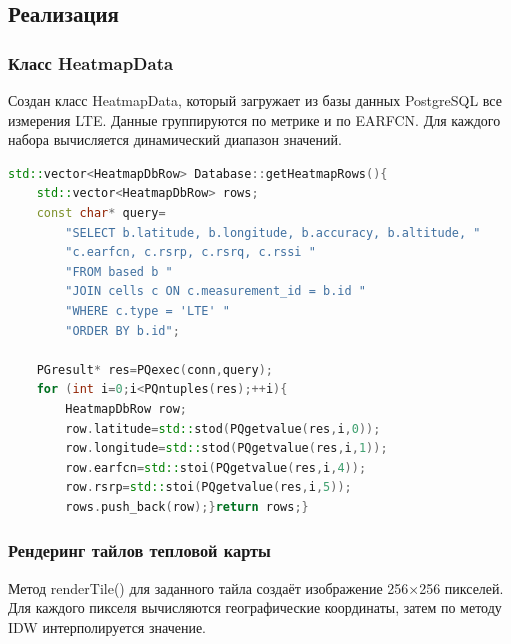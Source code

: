 \subsection{Реализация}

\subsubsection{Класс HeatmapData}

Создан класс HeatmapData, который загружает из базы данных PostgreSQL все измерения LTE. Данные группируются по метрике и по EARFCN. Для каждого набора вычисляется динамический диапазон значений.

\begin{lstlisting}[language=C++, caption=Загрузка данных для тепловой карты из БД, label=lst:heatmap_load]
std::vector<HeatmapDbRow> Database::getHeatmapRows(){
    std::vector<HeatmapDbRow> rows;
    const char* query=
        "SELECT b.latitude, b.longitude, b.accuracy, b.altitude, "
        "c.earfcn, c.rsrp, c.rsrq, c.rssi "
        "FROM based b "
        "JOIN cells c ON c.measurement_id = b.id "
        "WHERE c.type = 'LTE' "
        "ORDER BY b.id";
    
    PGresult* res=PQexec(conn,query);
    for (int i=0;i<PQntuples(res);++i){
        HeatmapDbRow row;
        row.latitude=std::stod(PQgetvalue(res,i,0));
        row.longitude=std::stod(PQgetvalue(res,i,1));
        row.earfcn=std::stoi(PQgetvalue(res,i,4));
        row.rsrp=std::stoi(PQgetvalue(res,i,5));
        rows.push_back(row);}return rows;}
\end{lstlisting}

\subsubsection{Рендеринг тайлов тепловой карты}

Метод renderTile() для заданного тайла создаёт изображение 256×256 пикселей. Для каждого пикселя вычисляются географические координаты, затем по методу IDW интерполируется значение.


